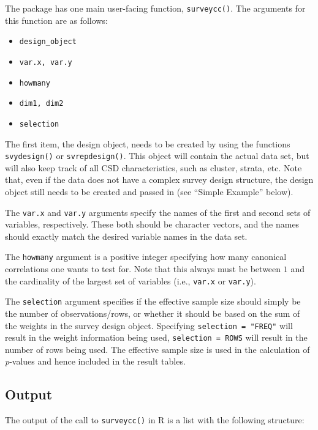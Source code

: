The  package has one main user-facing function, \texttt{surveycc()}. The arguments for this function are as follows:

\begin{itemize}
\tightlist
\item
  \texttt{design\_object}
\item
  \texttt{var.x,\ var.y}
\item
  \texttt{howmany}
\item
  \texttt{dim1,\ dim2}
\item
  \texttt{selection}
\end{itemize}

The first item, the design object, needs to be created by using the  functions \texttt{svydesign()} or \texttt{svrepdesign()}. This object will contain the actual data set, but will also keep track of all CSD characteristics, such as cluster, strata, etc. Note that, even if the data does not have a complex survey design structure, the design object still needs to be created and passed in (see ``Simple Example'' below).

The \texttt{var.x} and \texttt{var.y} arguments specify the names of the first and second sets of variables, respectively. These both should be character vectors, and the names should exactly match the desired variable names in the data set.

The \texttt{howmany} argument is a positive integer specifying how many canonical correlations one wants to test for. Note that this always must be between \(1\) and the cardinality of the largest set of variables (i.e., \texttt{var.x} or \texttt{var.y}).

The \texttt{selection} argument specifies if the effective sample size should simply be the number of observations/rows, or whether it should be based on the sum of the weights in the survey design object. Specifying \texttt{selection\ =\ "FREQ"} will result in the weight information being used, \texttt{selection\ =\ ROWS} will result in the number of rows being used. The effective sample size is used in the calculation of \emph{p}-values and hence included in the result tables.

\hypertarget{output}{%
\subsection{Output}\label{output}}

The output of the call to \texttt{surveycc()} in R is a list with the following structure:

